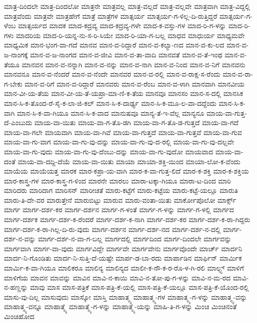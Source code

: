 {ಮಾತ್ರ-ದಿಂದಲೇ
ಮಾತ್ರ-ದಿಂದಲೋ
ಮಾತ್ರನೇ
ಮಾತ್ರವಲ್ಲ
ಮಾತ್ರ-ವಲ್ಲದೆ
ಮಾತ್ರ-ವಲ್ಲವೇ
ಮಾತ್ರವಾಗಿ
ಮಾತ್ರ-ವಿದ್ದಲ್ಲಿ
ಮಾತ್ರವೆಂದು
ಮಾತ್ರವೇ
ಮಾತ್ರಹೇಗೆ
ಮಾತ್ರೆ
ಮಾತ್ರೆಗಳ
ಮಾತ್ಸರ್ಯ
ಮಾತ್ಸರ್ಯ-ಗ-ಳಿಲ್ಲ-ದಿ-ರುತ್ತಿದ್ದರೆ
ಮಾತ್ಸರ್ಯ-ಗ-ಳೆಂಬ
ಮಾತ್ಸರ್ಯದ
ಮಾದಕ
ಮಾದ-ಕದ್ರವ್ಯ
ಮಾದ-ಕದ್ರವ್ಯ-ಗಳೇ
ಮಾದ-ಕ-ವಸ್ತು-ಗಳ
ಮಾದ-ರಿ-ಗ-ಳನ್ನು
ಮಾದ-ರಿ-ಗಳು
ಮಾದರಿಯ
ಮಾದ-ರಿ-ಯನ್ನ-ನು-ಸ-ರಿ-ಸಿಯೇ
ಮಾದ-ರಿ-ಯಾ-ಗ-ಬಲ್ಲ
ಮಾಧವ
ಮಾಧುರ್ಯ
ಮಾಧ್ಯಮವೇ
ಮಾಧ್ಯಮಿಕ
ಮಾನ-ಭಂಗ-ವಾ-ಗದೆ
ಮಾನವ
ಮಾನ-ವ-ರಿದ್ದಾರೆ
ಮಾನ-ವ-ಕಲ್ಯಾ-ಣದ
ಮಾನ-ವ-ಕು-ಲದ
ಮಾನ-ವ-ಜ-ನಾಂಗಕ್ಕೆ
ಮಾನ-ವ-ಜ-ನಾಂಗದ
ಮಾನ-ವ-ಜೀವಿ
ಮಾನ-ವ-ತಾ-ವಾದಿ
ಮಾನವತೆ
ಮಾನ-ವ-ತೆ-ಇಂಥ
ಮಾನ-ವ-ತೆಯೂ
ಮಾನವನ
ಮಾನ-ವ-ನನ್ನಾಗಿ
ಮಾನ-ವ-ನನ್ನು
ಮಾನ-ವ-ನಾಗಿ
ಮಾನ-ವ-ನಿಂದ
ಮಾನ-ವ-ನಿಗೆ
ಮಾನವನು
ಮಾನವನೂ
ಮಾನ-ವ-ನೆಂದರೆ
ಮಾನ-ವ-ನೆಂದೇ
ಮಾನವರ
ಮಾನ-ವ-ರಲ್ಲಿ
ಮಾನ-ವ-ರಾಕ್ಷ-ಸ-ರೆಂದು
ಮಾನ-ವ-ರಾ-ಗ-ಬೇಕು
ಮಾನ-ವ-ರಿಗೆ
ಮಾನ-ವ-ರಿದ್ದಾರೆ
ಮಾನವರು
ಮಾನ-ವ-ರೆಂಬ
ಮಾನ-ವ-ಳಾಗಿ
ಮಾನವಾಗಿ
ಮಾನವೀಯ
ಮಾನ-ವೀ-ಯ-ತೆಯ
ಮಾನ-ವೀ-ಯ-ತೆ-ಯಪ್ರಾ-ಮಾ-ಣಿ-ಕ-ತೆಯ
ಮಾನವೂ
ಮಾನಸಂ
ಮಾನ-ಸ-ದಲ್ಲಿ
ಮಾನಸಿಕ
ಮಾನ-ಸಿ-ಕ-ತೊಂದ-ರೆ-ಸೈ-ಕ-ಲಾ-ಜಿ-ಕಲ್
ಮಾನ-ಸಿ-ಕ-ದಾರ್ಢ್ಯ
ಮಾನ-ಸಿ-ಕ-ಮೂ-ಲ-ವಾ-ದದ್ದೆಂದು
ಮಾನ-ಸಿ-ಕ-ವಾಗಿ
ಮಾನ-ಸಿ-ಕ-ವಾ-ಗಿಯೂ
ಮಾನ-ಸಿ-ಕ-ವಾದ
ಮಾನುಷವೂ
ಮಾನ್ಯ-ತೆ-ಇ-ವೆಲ್ಲ
ಮಾನ್ಯನೂ
ಮಾಯ-ವಾ-ಗುತ್ತ-ದೆ-ಎಂಬುದು
ಮಾಯ-ವಾ-ಯಿತು
ಮಾಯ-ವಾ-ಗ-ತೊ-ಡಗಿ
ಮಾಯ-ವಾ-ಗ-ತೊ-ಡ-ಗುತ್ತದೆ
ಮಾಯ-ವಾ-ಗದೆ
ಮಾಯ-ವಾ-ಗಲೇ
ಮಾಯವಾಗಿ
ಮಾಯ-ವಾ-ಗಿವೆ
ಮಾಯ-ವಾ-ಗುತ್ತದೆ
ಮಾಯ-ವಾ-ಗುತ್ತವೆ
ಮಾಯ-ವಾ-ಗುವ
ಮಾಯ-ವಾ-ಗು-ವಾಗ
ಮಾಯ-ವಾ-ಗು-ವು-ದನ್ನು
ಮಾಯ-ವಾ-ಗು-ವು-ದ-ರಲ್ಲಿ
ಮಾಯ-ವಾ-ಗು-ವು-ದಲ್ಲವೇ
ಮಾಯ-ವಾ-ಗು-ವುದು
ಮಾಯ-ವಾ-ಗು-ವು-ದೆಂಬು-ದನ್ನು
ಮಾಯ-ವಾ-ಗು-ವುದೋ
ಮಾಯವಾದ
ಮಾಯ-ವಾ-ದಂತೆ
ಮಾಯ-ವಾ-ದದ್ದಿ-ದೆಯೆ
ಮಾಯ-ವಾ-ಯಿತು
ಮಾಯಾ
ಮಾಯಾ-ಶಕ್ತಿ-ಯಿಂದ
ಮಾಯಾ-ಲೋ-ಕ-ವೆಂದು
ಮಾಯೆಯ
ಮಾಯೆಯತ್ತ
ಮಾರಕ
ಮಾರ-ಕಪ್ರಾ-ಯ-ವಾಗಿ
ಮಾರ-ಕ-ವಾ-ಗುತ್ತ-ಲಿದೆ
ಮಾರ-ಕ-ಶಕ್ತಿ
ಮಾರ-ಕ-ಶಕ್ತಿಯ
ಮಾರ-ಕಾಸ್ತ್ರ-ಗಳ
ಮಾರ-ಕಾಸ್ತ್ರ-ಗ-ಳಿಂದ
ಮಾರನೇ
ಮಾರಲು
ಮಾರಾ-ಟಕ್ಕಾ-ಗಿಯೂ
ಮಾರಾ-ಟ-ದಿಂದ
ಮಾರಿ
ಮಾರಿದರು
ಮಾರಿದಾಗ
ಮಾರಿಸನ್
ಮಾರೀಚತೆ
ಮಾರು-ಕಟ್ಟೆಗೆ
ಮಾರು-ಕಟ್ಟೆಯ
ಮಾರು-ಕಟ್ಟೆ-ಯಲ್ಲೂ
ಮಾರುತಿ
ಮಾರು-ತಿ-ದೇ-ವರ
ಮಾರುತ್ತೇನೆ
ಮಾರುಬಿಟ್ಟು
ಮಾರುವ
ಮಾರು-ವಂತಾ-ಯಿತು
ಮಾರ್ಕೋಪೊಲೋ
ಮಾರ್ಕ್ಸ್
ಮಾರ್ಗ
ಮಾರ್ಗ-ದರ್ಶ-ಕರ
ಮಾರ್ಗ-ದರ್ಶನ
ಮಾರ್ಗ-ಗ-ಳಂತೆ
ಮಾರ್ಗ-ಗ-ಳನ್ನು
ಮಾರ್ಗ-ಗ-ಳಲ್ಲಿ
ಮಾರ್ಗದ
ಮಾರ್ಗ-ದರ್ಶಕ
ಮಾರ್ಗ-ದರ್ಶ-ಕ-ರೆಂದರೆ
ಮಾರ್ಗ-ದರ್ಶ-ಕ-ನಾಗಿ
ಮಾರ್ಗ-ದರ್ಶ-ಕರ
ಮಾರ್ಗ-ದರ್ಶ-ಕ-ರಾ-ಗಿದ್ದರು
ಮಾರ್ಗ-ದರ್ಶ-ಕ-ರಾ-ಗಿಲ್ಲ-ದಿ-ರು-ವುದು
ಮಾರ್ಗ-ದರ್ಶನ
ಮಾರ್ಗ-ದರ್ಶ-ನದ
ಮಾರ್ಗ-ದರ್ಶ-ನ-ದಲ್ಲಿ
ಮಾರ್ಗ-ದರ್ಶ-ನ-ವನ್ನು
ಮಾರ್ಗ-ದರ್ಶ-ನ-ವಾ-ಗ-ಬಲ್ಲ
ಮಾರ್ಗದಲ್ಲಿ
ಮಾರ್ಗದಿಂದ
ಮಾರ್ಗ-ದಿಂದಲೇ
ಮಾರ್ಗವನ್ನು
ಮಾರ್ಗವಾಗಿ
ಮಾರ್ಗ-ವಾ-ವುದು
ಮಾರ್ಗವಿದ್ದೇ
ಮಾರ್ಗವೇ
ಮಾರ್ಗವೇನು
ಮಾರ್ಗವೊಂದೇ
ಮಾರ್ಚ್
ಮಾರ್ದನಿ
ಮಾರ್ದ-ನಿ-ಗೊಂಡಿತು
ಮಾರ್ದ-ನಿ-ಸುತ್ತಿ-ದೆ-ಯಷ್ಟೇ
ಮಾರ್ಪ-ಡ-ಬಾ-ರದು
ಮಾರ್ಪಾಡಿನ
ಮಾರ್ಫಿನ್
ಮಾರ್ಮಿಕ
ಮಾರ್ಮಿ-ಕ-ವಾ-ಗಿಯೂ
ಮಾಲಿಕರೂ
ಮಾಲಿನ್ಯ
ಮಾಲಿನ್ಯದ
ಮಾಲೀ-ಕ-ನೌ-ಕ-ರ-ರೊ-ಳ-ಗಿ-ರಲಿ
ಮಾಲ್ಟ್ಸ್
ಮಾಳಿಗೆ
ಮಾಳಿಗೆಯ
ಮಾವನ
ಮಾವನ್ನು
ಮಾವಿನ
ಮಾವಿ-ನ-ಕಾಯಿ
ಮಾವಿ-ನ-ತೋ-ಪು-ಗ-ಳನ್ನು
ಮಾವಿ-ನ-ಮ-ರದ
ಮಾವಿ-ನ-ಹಣ್ಣನ್ನು
ಮಾವು
ಮಾಸ
ಮಾಸ-ಪತ್ರಿಕೆ
ಮಾಸ-ಪತ್ರಿ-ಕೆ-ಯಲ್ಲಿ
ಮಾಸ-ಪತ್ರಿ-ಕೆ-ಯಲ್ಲೂ
ಮಾಸ-ಪತ್ರಿ-ಕೆ-ಯೊಂದ-ರಲ್ಲಿ
ಮಾಸು-ವು-ದಿಲ್ಲ
ಮಾಸುವುದು
ಮಾಸ್ಕೋ
ಮಾಸ್ತಿ
ಮಾಹಾತ್ಮ್ಯ
ಮಾಹಾತ್ಮ್ಯ-ಗಳ
ಮಾಹಾತ್ಮ್ಯ-ಗ-ಳನ್ನು
ಮಾಹಾತ್ಮ್ಯ-ವನ್ನು
ಮಾಹಾತ್ಮ್ಯ-ವನ್ನೂ
ಮಾಹಾತ್ಮ್ಯೆ
ಮಾಹಾತ್ಮ್ಯೆ-ಗ-ಳನ್ನು
ಮಾಹಾತ್ಮ್ಯೆ-ಯನ್ನು
ಮಾಹಿ-ತಿ-ಗ-ಳನ್ನು
ಮಿಂಚಿ
ಮಿಂಚಿನಂತೆ
ಮಿಂಚಿಹೋದ
}
